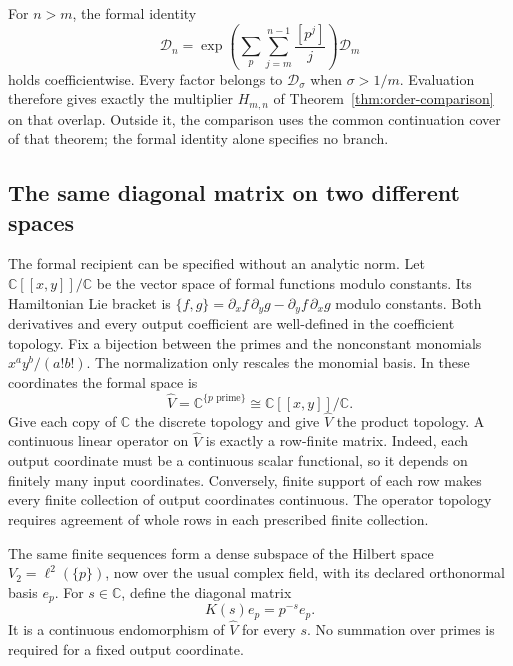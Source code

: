 For $n>m$, the formal identity
\[
 \mathscr D_n=
 \exp\left(\sum_p\sum_{j=m}^{n-1}\frac{[p^j]}j\right)
 \mathscr D_m
\]
holds coefficientwise. Every factor belongs to $\mathscr D_\sigma$
when $\sigma>1/m$. Evaluation therefore gives exactly the multiplier
$H_{m,n}$ of Theorem~\ref{thm:order-comparison} on that overlap.
Outside it, the comparison uses the common continuation cover of
that theorem; the formal identity alone specifies no branch.

\subsection{The same diagonal matrix on two different spaces}
\label{sec:da-operators}

The formal recipient can be specified without an analytic norm.
Let $\mathbb C[[x,y]]/\mathbb C$ be the vector space of formal
functions modulo constants. Its Hamiltonian Lie bracket is
$\{f,g\}=\partial_xf\,\partial_yg-\partial_yf\,\partial_xg$
modulo constants. Both derivatives and every output coefficient are
well-defined in the coefficient topology. Fix a bijection between the primes and the nonconstant
monomials $x^ay^b/(a!b!)$. The normalization only rescales the
monomial basis. In these coordinates the formal space is
\[
 \widehat V=\mathbb C^{\{p\text{ prime}\}}
       \cong\mathbb C[[x,y]]/\mathbb C.
\]
Give each copy of $\mathbb C$ the discrete topology and give
$\widehat V$ the product topology. A continuous linear operator on
$\widehat V$ is exactly a row-finite matrix. Indeed, each output
coordinate must be a continuous scalar functional, so it depends
on finitely many input coordinates. Conversely, finite support of
each row makes every finite collection of output coordinates
continuous. The operator topology requires agreement of whole rows
in each prescribed finite collection.

The same finite sequences form a dense subspace of the Hilbert space
$V_2=\ell^2(\{p\})$, now over the usual complex field, with its
declared orthonormal basis $e_p$. For $s\in\mathbb C$, define the
diagonal matrix
\[
 K(s)e_p=p^{-s}e_p.
\]
It is a continuous endomorphism of $\widehat V$ for every $s$.
No summation over primes is required for a fixed output coordinate.

